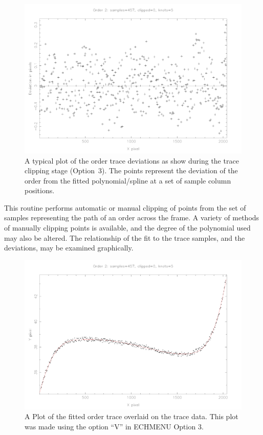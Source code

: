 \documentclass[twoside,11pt]{article}
\renewcommand{\_}{\texttt{\symbol{95}}}
\begin{document}
\begin{figure}
\begin{center}
\includegraphics[width=\textwidth]{sun152_02}

\parbox{140mm}{
\caption{A typical plot of the order trace deviations as show during
the trace clipping stage (Option~3).  The points represent the
deviation of the order from the fitted polynomial/spline at a set of
sample column positions.}
\label{fi_tclip}
}
\end{center}
\end{figure}

This routine performs automatic or manual  clipping of points from the
set of samples representing the path of an order across the frame.
A variety of methods of manually clipping points is available, and the degree
of the polynomial used may also be altered. The relationship of the fit
to the trace samples, and the deviations, may be examined graphically.

\begin{figure}
\begin{center}
\includegraphics[width=\textwidth]{sun152_03}

\parbox{140mm}{
\caption{A Plot of the fitted order trace overlaid on the trace data.
This plot was made using the option ``V'' in ECHMENU Option 3.}
\label{fi_tracefit}
}
\end{center}
\end{figure}
\end{document}
